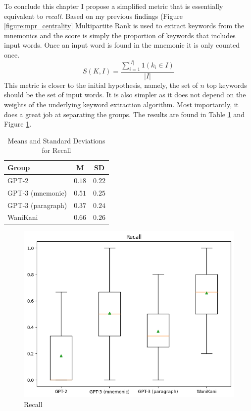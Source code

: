 To conclude this chapter I propose a simplified metric that is essentially equivalent to \emph{recall}. Based on my previous findings (Figure \ref{figure:mpr_centrality} Multipartite Rank is used to extract keywords from the mnemonics and the score is simply the proportion of keywords that includes input words. Once an input word is found in the mnemonic it is only counted once. 
\begin{equation}
    S(K, I) = \frac{\sum_{i=1}^{|I|} 1(k_i \in I)}{|I|}
\end{equation}
This metric is closer to the initial hypothesis, namely, the set of $n$ top keywords should be the set of input words. It is also simpler as it does not depend on the weights of the underlying keyword extraction algorithm. Most importantly, it does a great job at separating the groups. The results are found in Table \ref{tab:final_metric_recall} and Figure \ref{figure:recall}.
\begin{table}[ht] 
\centering
\caption{Means and Standard Deviations for Recall}
\label{table:group_stats}
\begin{tabular}{lcc}
\toprule
Group & M & SD\\
\midrule
GPT-2& $0.18$ & $0.22$ \\
GPT-3 (mnemonic) & $0.51$ & $0.25$ \\
GPT-3 (paragraph)& $0.37$ & $0.24$ \\
WaniKani & $0.66$ & $0.26$ \\
\bottomrule
\end{tabular}
\label{tab:final_metric_recall}
\end{table}
\begin{figure}
    \centering
    \includegraphics[width=400pt]{resources/recall.png}
    \caption{Recall}
    \label{figure:recall}
\end{figure}





